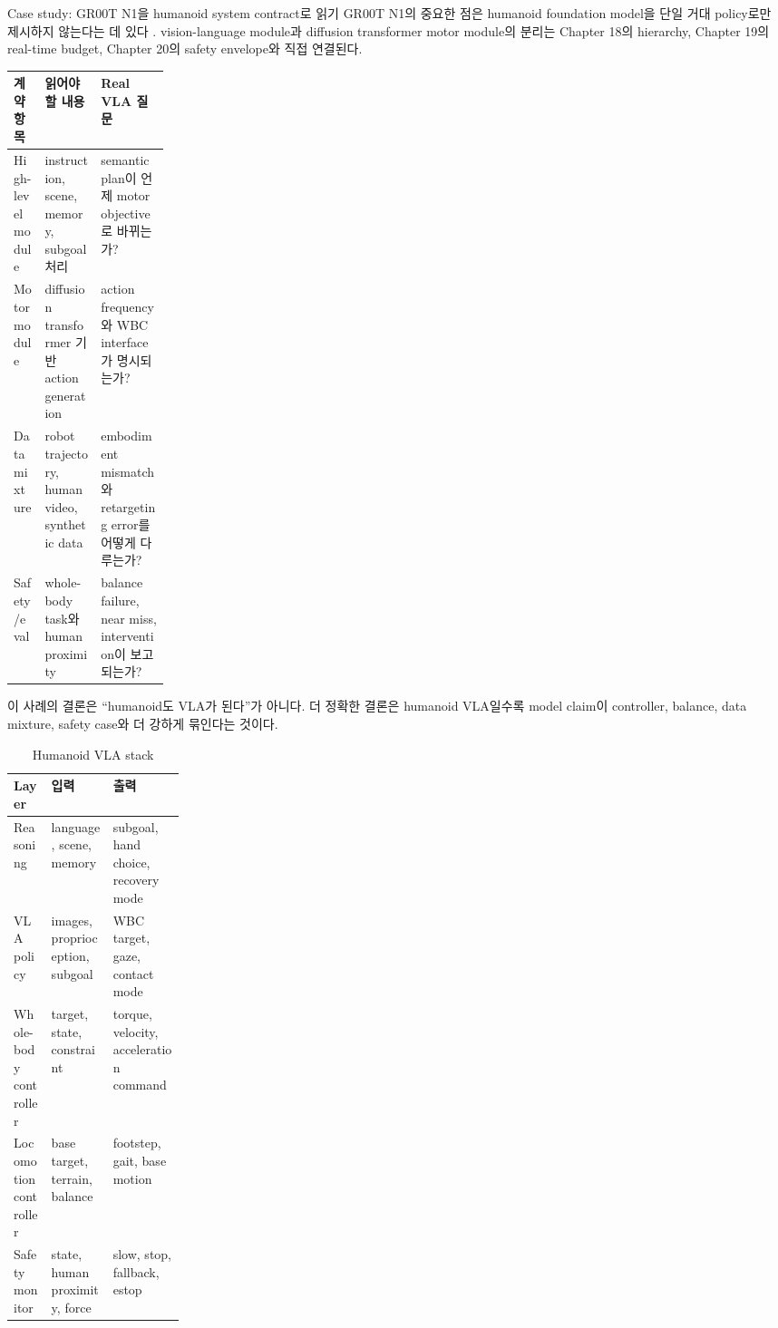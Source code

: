 \begin{casebox}{Case study: GR00T N1을 humanoid system contract로 읽기}
GR00T N1의 중요한 점은 humanoid foundation model을 단일 거대 policy로만 제시하지 않는다는 데 있다 \cite{grootn12025}. vision-language module과 diffusion transformer motor module의 분리는 Chapter 18의 hierarchy, Chapter 19의 real-time budget, Chapter 20의 safety envelope와 직접 연결된다.

\begin{center}
\small
\begin{tabularx}{\linewidth}{@{}p{0.2\linewidth}X X@{}}
\toprule
계약 항목 & 읽어야 할 내용 & Real VLA 질문 \\
\midrule
High-level module & instruction, scene, memory, subgoal 처리 & semantic plan이 언제 motor objective로 바뀌는가? \\
Motor module & diffusion transformer 기반 action generation & action frequency와 WBC interface가 명시되는가? \\
Data mixture & robot trajectory, human video, synthetic data & embodiment mismatch와 retargeting error를 어떻게 다루는가? \\
Safety/eval & whole-body task와 human proximity & balance failure, near miss, intervention이 보고되는가? \\
\bottomrule
\end{tabularx}
\end{center}

이 사례의 결론은 ``humanoid도 VLA가 된다''가 아니다. 더 정확한 결론은 humanoid VLA일수록 model claim이 controller, balance, data mixture, safety case와 더 강하게 묶인다는 것이다.
\end{casebox}

\begin{table}[h]
  \centering
  \caption{Humanoid VLA stack}
  \begin{tabularx}{\linewidth}{p{0.22\linewidth}X X}
    \toprule
    Layer & 입력 & 출력 \\
    \midrule
    Reasoning & language, scene, memory & subgoal, hand choice, recovery mode \\
    VLA policy & images, proprioception, subgoal & WBC target, gaze, contact mode \\
    Whole-body controller & target, state, constraint & torque, velocity, acceleration command \\
    Locomotion controller & base target, terrain, balance & footstep, gait, base motion \\
    Safety monitor & state, human proximity, force & slow, stop, fallback, estop \\
    \bottomrule
  \end{tabularx}
  \label{tab:ch20-stack}
\end{table}

